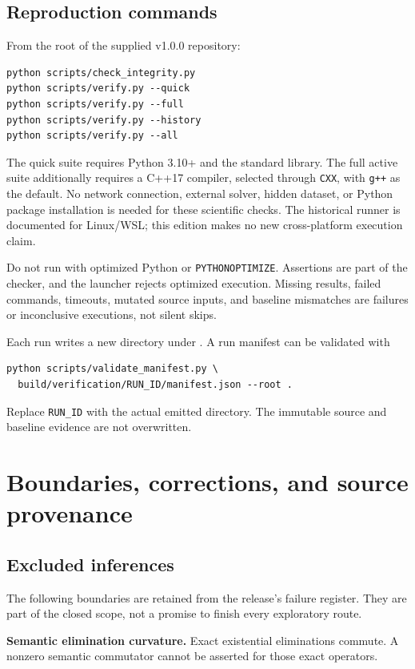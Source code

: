 \documentclass[11pt,letterpaper,oneside]{report}
\theoremstyle{komorebi}
\newcommand{\pathref}[1]{\texttt{\small\detokenize{#1}}}
\begin{document}
\section{Reproduction commands}
From the root of the supplied v1.0.0 repository:
\begin{verbatim}
python scripts/check_integrity.py
python scripts/verify.py --quick
python scripts/verify.py --full
python scripts/verify.py --history
python scripts/verify.py --all
\end{verbatim}
The quick suite requires Python 3.10+ and the standard library. The full active suite additionally requires a C++17 compiler, selected through \texttt{CXX}, with \texttt{g++} as the default. No network connection, external solver, hidden dataset, or Python package installation is needed for these scientific checks. The historical runner is documented for Linux/WSL; this edition makes no new cross-platform execution claim.

Do not run with optimized Python or \texttt{PYTHONOPTIMIZE}. Assertions are part of the checker, and the launcher rejects optimized execution. Missing results, failed commands, timeouts, mutated source inputs, and baseline mismatches are failures or inconclusive executions, not silent skips.

Each run writes a new directory under \pathref{build/verification/}. A run manifest can be validated with
\begin{verbatim}
python scripts/validate_manifest.py \
  build/verification/RUN_ID/manifest.json --root .
\end{verbatim}
Replace \texttt{RUN\_ID} with the actual emitted directory. The immutable source and baseline evidence are not overwritten.

\chapter{Boundaries, corrections, and source provenance}
\label{app:boundaries}
\section{Excluded inferences}
The following boundaries are retained from the release's failure register. They are part of the closed scope, not a promise to finish every exploratory route.

\textbf{Semantic elimination curvature.} Exact existential eliminations commute. A nonzero semantic commutator cannot be asserted for those exact operators.
\end{document}

